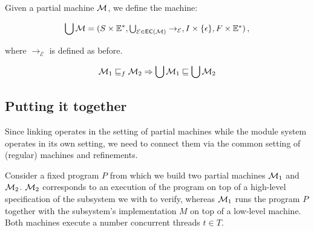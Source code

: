 \begin{definition}
Given a partial machine $\mathcal{M}$,
we define the machine:
\begin{small}
\[ \bigcup \mathcal{M} =
	(S \times \mathbb{E}^*, \textstyle\bigcup\nolimits_{\mathcal{E} \in {{\mathsf{EC}}({\mathcal{M}})}} \rightarrow_\mathcal{E},
		I \times \{ \epsilon \}, F \times \mathbb{E}^*) \,, \]
\end{small}%
where $\rightarrow_\mathcal{E}$ is defined as before.
\end{definition}

\begin{lemma}
\begin{small}
\[ \mathcal{M}_1 \sqsubseteq_f \mathcal{M}_2 \Rightarrow \bigcup \mathcal{M}_1 \sqsubseteq \bigcup \mathcal{M}_2 \]
\end{small}
\end{lemma}

\subsection{Putting it together}

Since linking operates in the setting of partial machines
while the module system operates in its own setting,
we need to connect them
via the common setting of (regular) machines and refinements.

Consider a fixed program $P$
from which we build two partial machines $\mathcal{M}_1$ and $\mathcal{M}_2$.
$\mathcal{M}_2$ corresponds to an execution of the program
on top of a high-level specification of the subsystem
we with to verify,
whereas $\mathcal{M}_1$ runs the program $P$ together with the subsystem's implementation $M$
on top of a low-level machine.
Both machines execute a number concurrent threads $t \in T$.

